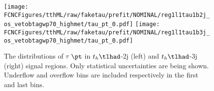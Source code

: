 \begin{figure}[H]
\centering
\texttt{[image: \\FCNCFigures/tthML/raw/faketau/prefit/NOMINAL/reg1l1tau1b2j\_os\_vetobtagwp70\_highmet/tau\_pt\_0.pdf]}
\texttt{[image: \\FCNCFigures/tthML/raw/faketau/prefit/NOMINAL/reg1l1tau1b3j\_os\_vetobtagwp70\_highmet/tau\_pt\_0.pdf]}

\caption{ The distributions of $\tau$ $\pt$ in $t_h\tlhad$-2j (left) and $t_h\tlhad$-3j (right) signal regions. Only
statistical uncertainties are being shown. Underflow and overflow bins are included respectively in the first and last bins.}
\label{fig:intro_pt_raw}
\end{figure}
